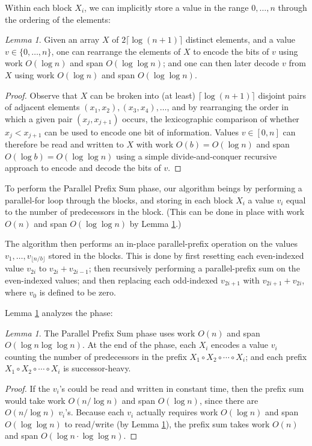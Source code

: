 \documentclass[sigplan, 10pt, nonacm]{acmart}
\theoremstyle{remark}
\newtheorem{lemma}[thm]{Lemma}
\theoremstyle{remark}
\begin{document}
\begin{appendices}
Within each block $X_i$, we can implicitly store a value in the range
$0, \ldots, n$ through the ordering of the elements:
\begin{lemma}
Given an array $X$ of $2 \lceil \log (n + 1) \rceil$ distinct
elements, and a value $v \in \{0, \ldots, n\}$, one can rearrange the
elements of $X$ to encode the bits of $v$ using work $O(\log n)$ and
span $O(\log \log n)$; and one can then later decode $v$ from $X$
using work $O(\log n)$ and span $O(\log \log n)$.
\label{lem:bitstore}
\end{lemma}
\begin{proof}
Observe that $X$ can be broken into (at least) $\lceil \log (n + 1)
\rceil$ disjoint pairs of adjacent elements $(x_1, x_2), (x_3, x_4),
\ldots$, and by rearranging the order in which a given pair $(x_j,
x_{j + 1})$ occurs, the lexicographic comparison of whether $x_j <
x_{j + 1}$ can be used to encode one bit of information. Values $v \in
[0,n]$ can therefore be read and written to $X$ with work $O(b) =
O(\log n)$ and span $O(\log b) = O(\log \log n)$ using a simple
divide-and-conquer recursive approach to encode and decode the bits of
$v$.
\end{proof}

To perform the Parallel Prefix Sum phase, our algorithm beings by
performing a parallel-for loop through the blocks, and storing in each
block $X_i$ a value $v_i$ equal to the number of predecessors in the
block. (This can be done in place with work $O(n)$ and span $O(\log
\log n)$ by Lemma \ref{lem:bitstore}.)

The algorithm then performs an in-place parallel-prefix operation on
the values $v_1, \ldots, v_{\lfloor n / b \rfloor}$ stored in the
blocks. This is done by first resetting each even-indexed value
$v_{2i}$ to $v_{2i} + v_{2i - 1}$; then recursively performing a
parallel-prefix sum on the even-indexed values; and then replacing
each odd-indexed $v_{2i + 1}$ with $v_{2i + 1} + v_{2i}$, where $v_0$
is defined to be zero.

Lemma \ref{lem:parallelprefix} analyzes the phase:
\begin{lemma}
The Parallel Prefix Sum phase uses work $O(n)$ and span $O(\log n \log
\log n)$. At the end of the phase, each $X_i$ encodes a value $v_i$
counting the number of predecessors in the prefix $X_1 \circ X_2 \circ
\cdots \circ X_i$; and each prefix $X_1 \circ X_2 \circ \cdots \circ
X_i$ is successor-heavy.
\label{lem:parallelprefix}
\end{lemma}
\begin{proof}
If the $v_i$'s could be read and written in constant time, then the
prefix sum would take work $O(n / \log n)$ and span $O(\log n)$, since
there are $O(n / \log n)$ $v_i$'s. Because each $v_i$ actually
requires work $O(\log n)$ and span $O(\log \log n)$ to read/write (by
Lemma \ref{lem:bitstore}), the prefix sum takes work $O(n)$ and span
$O(\log n \cdot \log \log n)$.


\end{proof}
\end{appendices}
\end{document}
